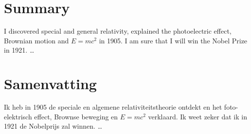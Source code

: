 \chapter*{Summary}
\makeatletter\@openrightfalse
{}

I discovered special and general relativity, explained the photoelectric effect, Brownian motion and $E=mc^2$ in 1905. I am sure that I will win the Nobel Prize in 1921. \ldots

\chapter*{Samenvatting}
\makeatletter\@openrightfalse
{}

{
Ik heb in 1905 de speciale en algemene relativiteitstheorie ontdekt en het foto-elektrisch effect, Brownse beweging en $E = mc ^ 2$ verklaard. Ik weet zeker dat ik in 1921 de Nobelprijs zal winnen.
\ldots

}

